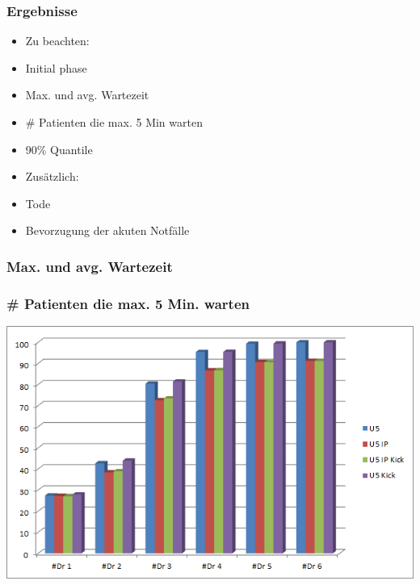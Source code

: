 \documentclass{beamer}
\begin{document}
%
%
%
\begin{frame}
	\frametitle{Ergebnisse}
	\begin{minipage}{.5\textwidth}
		\begin{flushleft}		
			\begin{itemize}
				\item[] Zu beachten:
				\item Initial phase
				\item Max. und avg. Wartezeit
				\item \# Patienten die max. 5 Min warten
				\item 90\% Quantile
			\end{itemize}
		\end{flushleft}
	\end{minipage}
	\begin{minipage}{.4\textwidth}
		\begin{flushright}
			\begin{itemize}
				\item[] Zus\"{a}tzlich:
				\item Tode
				\item Bevorzugung der akuten Notf\"{a}lle
			\end{itemize}
		\end{flushright}
	\end{minipage}
\end{frame}

\begin{frame}
	\frametitle{Max. und avg. Wartezeit}
\end{frame}

\begin{frame}
	\frametitle{\# Patienten die max. 5 Min. warten}
	\begin{center}
		\includegraphics[scale=0.6]{img/U5.png}
	\end{center}
\end{frame}
\end{document}
